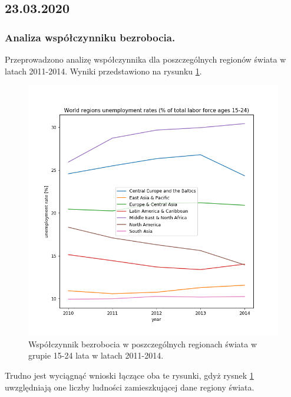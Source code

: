 \documentclass{article}
\begin{document}
  \clearpage

\subsection{23.03.2020}

\subsubsection{Analiza współczynniku bezrobocia.}

Przeprowadzono analizę współczynnika dla poszczególnych regionów świata w latach 2011-2014. Wyniki przedstawiono na rysunku \ref{fig:7_world_unemployment_regions}.

\begin{figure}[h!]
\begin{center}
\includegraphics[width=5 in]{Pictures/7_unemployment_world_regions.png}
\end{center}
\captionsetup{justification=centering}
\caption{Współczynnik bezrobocia w poszczególnych regionach świata w grupie 15-24 lata w latach 2011-2014.}
\label{fig:7_world_unemployment_regions}
\end{figure}

Trudno jest wyciągnąć wnioski łączące oba te rysunki, gdyż rysnek \ref{fig:7_world_unemployment_regions} uwzględniają one liczby ludności zamieszkującej dane regiony świata. 
\end{document}
